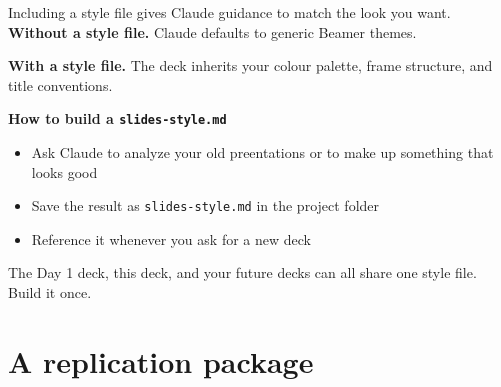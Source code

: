 \documentclass[aspectratio=169, 10pt]{beamer}
\begin{document}
\begin{frame}{Including a style file gives Claude guidance to match the look you want.}
\vskip0.2cm
\textbf{Without a style file.} Claude defaults to generic Beamer themes. 

\vskip0.3cm
\textbf{With a style file.} The deck inherits your colour palette, frame structure, and title conventions.

\vskip0.4cm
\textbf{How to build a \texttt{slides-style.md}}
\begin{itemize}
  \item Ask Claude to analyze your old preentations or to make up something that looks good
  \item Save the result as \texttt{slides-style.md} in the project folder
  \item Reference it whenever you ask for a new deck
\end{itemize}

\vskip0.4cm
\begin{sowhat}
The Day 1 deck, this deck, and your future decks can all share one style file. Build it once.
\end{sowhat}
\end{frame}

\section{A replication package}
\sourceline{}
\end{document}
